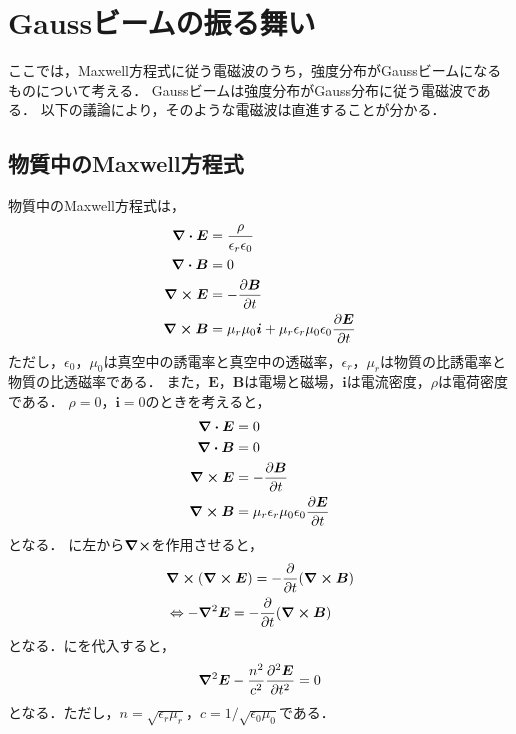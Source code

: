 \documentclass{report}
\begin{document}
  \maketitle
  \tableofcontents
  \chapter{Gaussビームの振る舞い}
    ここでは，Maxwell方程式に従う電磁波のうち，強度分布がGaussビームになるものについて考える．
    Gaussビームは強度分布がGauss分布に従う電磁波である．
    以下の議論により，そのような電磁波は直進することが分かる．
    \section{物質中のMaxwell方程式}
      物質中のMaxwell方程式は，
      \begin{align}
        \div \bm{E} &= \frac{\rho}{\epsilon_r\epsilon_0} \label{maxwell-1} \\ 
        \div \bm{B} &= 0 \label{maxwell-2} \\
        \curl \bm{E} &= -\pdv{\bm{B}}{t}\label{maxwell-3} \\
        \curl \bm{B} &= \mu_r\mu_0\bm{i} + \mu_r\epsilon_r\mu_0\epsilon_0\pdv{\bm{E}}{t}\label{maxwell-4}
      \end{align}
      ただし，$\epsilon_0$，$\mu_0$は真空中の誘電率と真空中の透磁率，$\epsilon_r$，$\mu_r$は物質の比誘電率と物質の比透磁率である．
      また，$\bm{E}$，$\bm{B}$は電場と磁場，$\bm{i}$は電流密度，$\rho$は電荷密度である．
      $\rho = 0$，$\bm{i} = 0$のときを考えると，
      \begin{align}
        \div \bm{E} &= 0 \label{maxwell-5} \\ 
        \div \bm{B} &= 0 \label{maxwell-6} \\
        \curl \bm{E} &= -\pdv{\bm{B}}{t} \label{maxwell-7} \\
        \curl \bm{B} &= \mu_r\epsilon_r\mu_0\epsilon_0\pdv{\bm{E}}{t}\label{maxwell-8}
      \end{align}
      となる．
      に左から$\curl$を作用させると，
      \begin{align}
        &\curl \qty(\curl \bm{E}) = -\pdv{t}\qty(\curl \bm{B}) \\
        &\Leftrightarrow -\grad^2 \bm{E} = -\pdv{t}\qty(\curl \bm{B}) \label{maxwell-9}
      \end{align}
      となる．にを代入すると，
      \begin{align}
        \grad^2 \bm{E} - \frac{n^2}{c^2}\pdv[2]{\bm{E}}{t} = 0\label{maxwell-10}
      \end{align}
      となる．ただし，$n = \sqrt{\epsilon_r\mu_r}$，$c = 1 / \sqrt{\epsilon_0\mu_0}$である．
\end{document}
